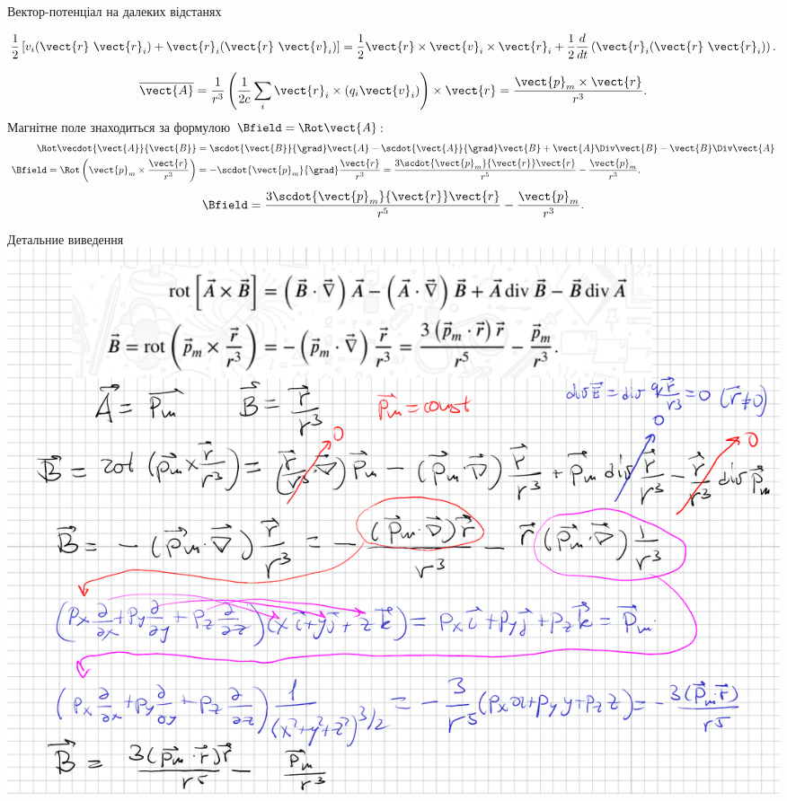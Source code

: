 \documentclass{beamer}
\begin{document}
\begin{frame}{Вектор-потенціал на далеких відстанях}{}
\begin{overprint}
\begin{center}
\begin{equation*}
				\frac12\left[v_i(\vect{r}\
					\vect{r}_i) + \vect{r}_i(\vect{r}\ \vect{v}_i)\right]
				= \frac12 \vect{r}\times\vect{v}_i\times\vect{r}_i + \frac12\frac{d}{dt}\left(\vect{r}_i(\vect{r}\ \vect{r}_i)\right).
			\end{equation*}
		\end{center}
		\begin{equation*}
			\overline{\vect{A}} =  \frac1{r^3}  \left(\frac1{2c} \sum_i \vect{r}_i\times (q_i\vect{v}_i)\right)\times\vect{r} =
			\frac{\vect{p}_m\times\vect{r}}{r^3} .
		\end{equation*}
		Магнітне поле знаходиться за формулою $\Bfield = \Rot\vect{A}$:
		{\scriptsize%
		\begin{align*}
			\Rot\vecdot{\vect{A}}{\vect{B}}                                 & = \scdot{\vect{B}}{\grad}\vect{A} - \scdot{\vect{A}}{\grad}\vect{B}
			+ 	\vect{A}\Div\vect{B} -
			\vect{B}\Div\vect{A}
			\\
			\Bfield = \Rot\left(\vect{p}_m\times\frac{\vect{r}}{r^3}\right) &
			=
			-\scdot{\vect{p}_m}{\grad}\frac{\vect{r}}{r^3} = \frac{3\scdot{\vect{p}_m}{\vect{r}}\vect{r}}{r^5} - \frac{\vect{p}_m}{r^3}.
		\end{align*}
		}
		\begin{equation*}
			\Bfield = \frac{3\scdot{\vect{p}_m}{\vect{r}}\vect{r}}{r^5} - \frac{\vect{p}_m}{r^3}.
		\end{equation*}
	\end{overprint}
\end{frame}






\begin{frame}{Детальние виведення}{}
	\thispagestyle{empty}
	\includegraphics[width=\linewidth]{BrotA}
\end{frame}
\end{document}
